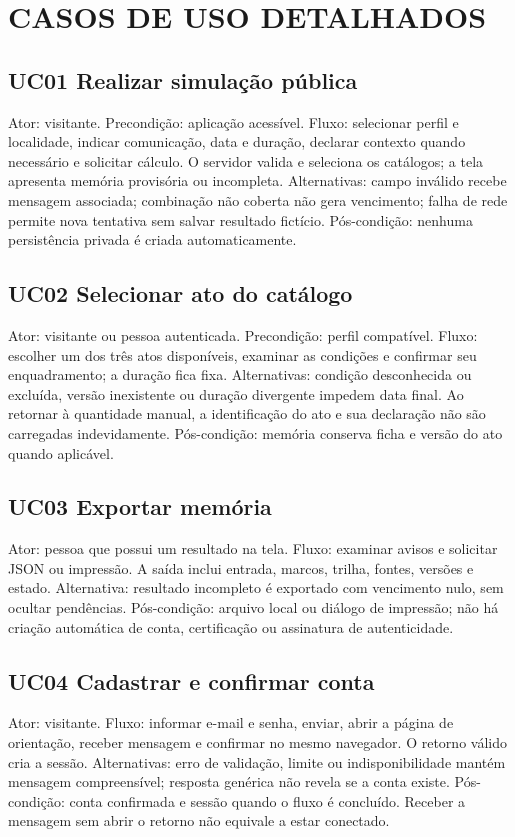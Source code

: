 \chapter{CASOS DE USO DETALHADOS}
\label{chapter-A}
\section{UC01 Realizar simulação pública}
\label{section-A-1}
Ator: visitante. Precondição: aplicação acessível. Fluxo: selecionar perfil e localidade, indicar comunicação, data e duração, declarar contexto quando necessário e solicitar cálculo. O servidor valida e seleciona os catálogos; a tela apresenta memória provisória ou incompleta. Alternativas: campo inválido recebe mensagem associada; combinação não coberta não gera vencimento; falha de rede permite nova tentativa sem salvar resultado fictício. Pós-condição: nenhuma persistência privada é criada automaticamente.

\section{UC02 Selecionar ato do catálogo}
\label{section-A-2}
Ator: visitante ou pessoa autenticada. Precondição: perfil compatível. Fluxo: escolher um dos três atos disponíveis, examinar as condições e confirmar seu enquadramento; a duração fica fixa. Alternativas: condição desconhecida ou excluída, versão inexistente ou duração divergente impedem data final. Ao retornar à quantidade manual, a identificação do ato e sua declaração não são carregadas indevidamente. Pós-condição: memória conserva ficha e versão do ato quando aplicável.

\section{UC03 Exportar memória}
\label{section-A-3}
Ator: pessoa que possui um resultado na tela. Fluxo: examinar avisos e solicitar JSON ou impressão. A saída inclui entrada, marcos, trilha, fontes, versões e estado. Alternativa: resultado incompleto é exportado com vencimento nulo, sem ocultar pendências. Pós-condição: arquivo local ou diálogo de impressão; não há criação automática de conta, certificação ou assinatura de autenticidade.

\section{UC04 Cadastrar e confirmar conta}
\label{section-A-4}
Ator: visitante. Fluxo: informar e-mail e senha, enviar, abrir a página de orientação, receber mensagem e confirmar no mesmo navegador. O retorno válido cria a sessão. Alternativas: erro de validação, limite ou indisponibilidade mantém mensagem compreensível; resposta genérica não revela se a conta existe. Pós-condição: conta confirmada e sessão quando o fluxo é concluído. Receber a mensagem sem abrir o retorno não equivale a estar conectado.

